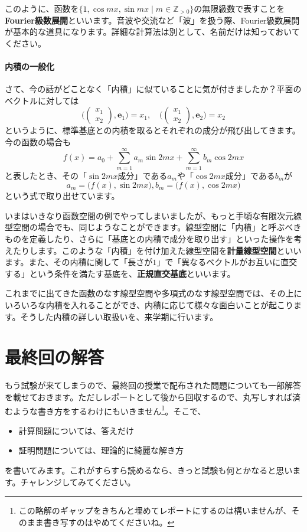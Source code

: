 このように、函数を$\{1, \cos mx, \sin mx \mid m\in\mathbb{Z}_{>0}\}$の無限級数で表すことを\textbf{Fourier級数展開}といいます。音波や交流など「波」を扱う際、Fourier級数展開が基本的な道具になります。詳細な計算法は別として、名前だけは知っておいてください。

\paragraph{内積の一般化}

さて、今の話がどことなく「内積」に似ていることに気が付きましたか？平面のベクトルに対しては
\[
\biggl(
\begin{pmatrix}
x_1 \\
x_2
\end{pmatrix}, 
\bm{e}_1
\biggr)
=
x_1, \quad
\biggl(
\begin{pmatrix}
x_1 \\
x_2
\end{pmatrix}, 
\bm{e}_2
\biggr)
=
x_2
\]
というように、標準基底との内積を取るとそれぞれの成分が飛び出してきます。今の函数の場合も
\[
f(x) = a_0 + \sum_{m = 1}^{\infty} a_m \sin 2mx + \sum_{m = 1}^{\infty} b_m \cos 2mx
\]
と表したとき、その「$\sin 2mx$成分」である$a_m$や「$\cos 2mx$成分」である$b_m$が
\[
a_m = \bigl(f(x), \sin 2mx\bigr), b_m = \bigl(f(x), \cos 2mx\bigr)
\]
という式で取り出せています。

いまはいきなり函数空間の例でやってしまいましたが、もっと手頃な有限次元線型空間の場合でも、同じようなことができます。線型空間に「内積」と呼ぶべきものを定義したり、さらに「基底との内積で成分を取り出す」といった操作を考えたりします。このような「内積」を付け加えた線型空間を\textbf{計量線型空間}といいます。また、その内積に関して「長さが$1$」で「異なるベクトルがお互いに直交する」という条件を満たす基底を、\textbf{正規直交基底}といいます。

これまでに出てきた函数のなす線型空間や多項式のなす線型空間では、その上にいろいろな内積を入れることができ、内積に応じて様々な面白いことが起こります。そうした内積の詳しい取扱いを、来学期に行います。

\section{最終回の解答}

もう試験が来てしまうので、最終回の授業で配布された問題についても一部解答を載せておきます。ただしレポートとして後から回収するので、丸写しすれば済むような書き方をするわけにもいきません\footnote{この略解のギャップをきちんと埋めてレポートにするのは構いませんが、そのまま書き写すのはやめてくださいね。}。そこで、
\begin{itemize}
\item 計算問題については、答えだけ
\item 証明問題については、理論的に綺麗な解き方
\end{itemize}
を書いてみます。これがすらすら読めるなら、きっと試験も何とかなると思います。チャレンジしてみてください。

